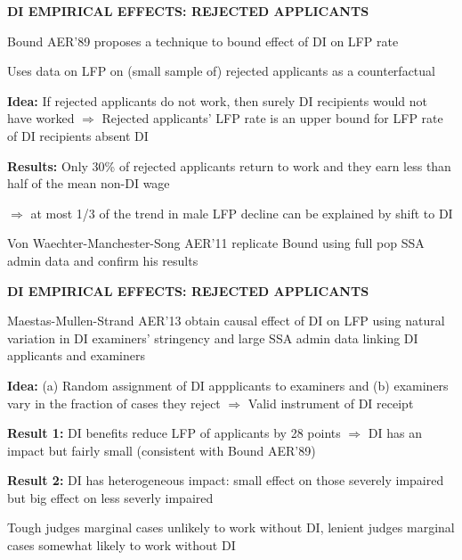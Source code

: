 \documentclass[landscape]{slides}
\begin{document}
\begin{slide}
\begin{center}
{\bf DI EMPIRICAL EFFECTS: REJECTED APPLICANTS}
\end{center}
Bound AER'89 proposes a technique to bound effect of DI on LFP rate

Uses data on LFP on (small sample of) rejected applicants as a counterfactual

\textbf{Idea:} If rejected applicants do not work, then surely DI recipients
would not have worked
$\Rightarrow$
Rejected applicants' LFP rate is an upper bound for LFP rate of DI
recipients absent DI

\textbf{Results:} Only 30\% of rejected applicants return to work
and they earn less than half of the mean non-DI wage

$\Rightarrow$ at most 1/3 of the trend in male LFP decline can be
explained by shift to DI

Von Waechter-Manchester-Song AER'11 replicate Bound using full pop SSA admin data
and confirm his results
\end{slide}

\begin{slide}

\end{slide}

\begin{slide}
\begin{center}
{\bf DI EMPIRICAL EFFECTS: REJECTED APPLICANTS}
\end{center}
Maestas-Mullen-Strand AER'13 obtain causal effect of DI
on LFP using natural variation in DI examiners' stringency and
large SSA admin data linking DI applicants and examiners

\textbf{Idea:} (a) Random assignment of DI appplicants to examiners and
(b) examiners vary in the fraction of cases they reject $\Rightarrow$ Valid
instrument of DI receipt

\textbf{Result 1:} DI benefits reduce LFP of applicants by 28 points $\Rightarrow$ DI has an impact
but fairly small (consistent with Bound AER'89)

\textbf{Result 2:} DI has heterogeneous impact: small effect on
those severely impaired but big effect on less severly impaired

\small Tough judges marginal cases unlikely to work without DI, lenient
judges marginal cases somewhat likely to work without DI

\end{slide}
\end{document}
